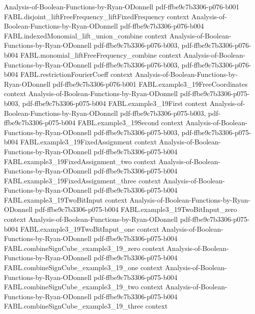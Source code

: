 \begin{theorem}
  {Analysis-of-Boolean-Functions-by-Ryan-ODonnell}
  {pdf-ffbe9c7b3306-p076-b001}
\proofstep
  {FABL.disjoint_liftFreeFrequency_liftFixedFrequency}
  {context}
  {Analysis-of-Boolean-Functions-by-Ryan-ODonnell}
  {pdf-ffbe9c7b3306-p076-b004}
\proofstep
  {FABL.indexedMonomial_lift_union_combine}
  {context}
  {Analysis-of-Boolean-Functions-by-Ryan-ODonnell}
  {pdf-ffbe9c7b3306-p076-b003,
    pdf-ffbe9c7b3306-p076-b004}
\proofstep
  {FABL.monomial_liftFreeFrequency_combine}
  {context}
  {Analysis-of-Boolean-Functions-by-Ryan-ODonnell}
  {pdf-ffbe9c7b3306-p076-b003,
    pdf-ffbe9c7b3306-p076-b004}
\proofstep
  {FABL.restrictionFourierCoeff}
  {context}
  {Analysis-of-Boolean-Functions-by-Ryan-ODonnell}
  {pdf-ffbe9c7b3306-p076-b001}
\proofstep
  {FABL.example3_19FreeCoordinates}
  {context}
  {Analysis-of-Boolean-Functions-by-Ryan-ODonnell}
  {pdf-ffbe9c7b3306-p075-b003,
    pdf-ffbe9c7b3306-p075-b004}
\proofstep
  {FABL.example3_19First}
  {context}
  {Analysis-of-Boolean-Functions-by-Ryan-ODonnell}
  {pdf-ffbe9c7b3306-p075-b003,
    pdf-ffbe9c7b3306-p075-b004}
\proofstep
  {FABL.example3_19Second}
  {context}
  {Analysis-of-Boolean-Functions-by-Ryan-ODonnell}
  {pdf-ffbe9c7b3306-p075-b003,
    pdf-ffbe9c7b3306-p075-b004}
\proofstep
  {FABL.example3_19FixedAssignment}
  {context}
  {Analysis-of-Boolean-Functions-by-Ryan-ODonnell}
  {pdf-ffbe9c7b3306-p075-b004}
\proofstep
  {FABL.example3_19FixedAssignment_two}
  {context}
  {Analysis-of-Boolean-Functions-by-Ryan-ODonnell}
  {pdf-ffbe9c7b3306-p075-b004}
\proofstep
  {FABL.example3_19FixedAssignment_three}
  {context}
  {Analysis-of-Boolean-Functions-by-Ryan-ODonnell}
  {pdf-ffbe9c7b3306-p075-b004}
\proofstep
  {FABL.example3_19TwoBitInput}
  {context}
  {Analysis-of-Boolean-Functions-by-Ryan-ODonnell}
  {pdf-ffbe9c7b3306-p075-b004}
\proofstep
  {FABL.example3_19TwoBitInput_zero}
  {context}
  {Analysis-of-Boolean-Functions-by-Ryan-ODonnell}
  {pdf-ffbe9c7b3306-p075-b004}
\proofstep
  {FABL.example3_19TwoBitInput_one}
  {context}
  {Analysis-of-Boolean-Functions-by-Ryan-ODonnell}
  {pdf-ffbe9c7b3306-p075-b004}
\proofstep
  {FABL.combineSignCube_example3_19_zero}
  {context}
  {Analysis-of-Boolean-Functions-by-Ryan-ODonnell}
  {pdf-ffbe9c7b3306-p075-b004}
\proofstep
  {FABL.combineSignCube_example3_19_one}
  {context}
  {Analysis-of-Boolean-Functions-by-Ryan-ODonnell}
  {pdf-ffbe9c7b3306-p075-b004}
\proofstep
  {FABL.combineSignCube_example3_19_two}
  {context}
  {Analysis-of-Boolean-Functions-by-Ryan-ODonnell}
  {pdf-ffbe9c7b3306-p075-b004}
\proofstep
  {FABL.combineSignCube_example3_19_three}
  {context}

\end{theorem}

